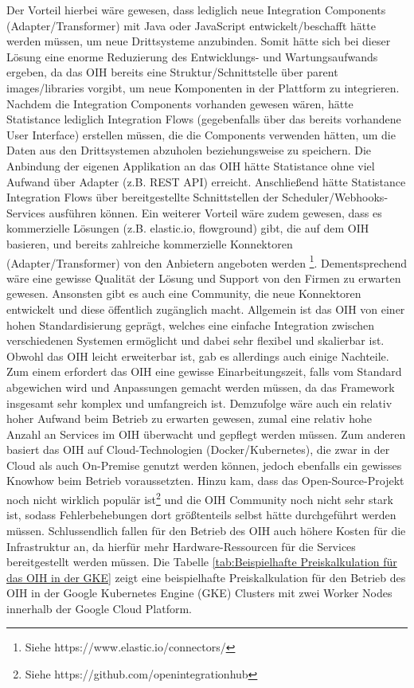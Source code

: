 Der Vorteil hierbei wäre gewesen, dass lediglich neue Integration Components (Adapter/Transformer) mit Java oder JavaScript entwickelt/beschafft hätte werden müssen, um neue Drittsysteme anzubinden. Somit hätte sich bei dieser Lösung eine enorme Reduzierung des Entwicklungs- und Wartungsaufwands ergeben, da das OIH bereits eine Struktur/Schnittstelle über parent images/libraries vorgibt, um neue Komponenten in der Plattform zu integrieren. Nachdem die Integration Components vorhanden gewesen wären, hätte Statistance lediglich Integration Flows (gegebenfalls über das bereits vorhandene User Interface) erstellen müssen, die die Components verwenden hätten, um die Daten aus den Drittsystemen abzuholen beziehungsweise zu speichern. Die Anbindung der eigenen Applikation an das OIH hätte Statistance ohne viel Aufwand über Adapter (z.B. REST API) erreicht. Anschließend hätte Statistance Integration Flows über bereitgestellte Schnittstellen der Scheduler/Webhooks-Services ausführen können. Ein weiterer Vorteil wäre zudem gewesen, dass es kommerzielle Lösungen (z.B. elastic.io, flowground) gibt, die auf dem OIH basieren, und bereits zahlreiche kommerzielle Konnektoren (Adapter/Transformer) von den Anbietern angeboten werden \footnote{Siehe https://www.elastic.io/connectors/}. Dementsprechend wäre eine gewisse Qualität der Lösung und Support von den Firmen zu erwarten gewesen. Ansonsten gibt es auch eine Community, die neue Konnektoren entwickelt und diese öffentlich zugänglich macht. Allgemein ist das OIH von einer hohen Standardisierung geprägt, welches eine einfache Integration zwischen verschiedenen Systemen ermöglicht und dabei sehr flexibel und skalierbar ist. \\
Obwohl das OIH leicht erweiterbar ist, gab es allerdings auch einige Nachteile. Zum einem erfordert das OIH eine gewisse Einarbeitungszeit, falls vom Standard abgewichen wird und Anpassungen gemacht werden müssen, da das Framework insgesamt sehr komplex und umfangreich ist. Demzufolge wäre auch ein relativ hoher Aufwand beim Betrieb zu erwarten gewesen, zumal eine relativ hohe Anzahl an Services im OIH überwacht und gepflegt werden müssen. Zum anderen basiert das OIH auf Cloud-Technologien (Docker/Kubernetes), die zwar in der Cloud als auch On-Premise genutzt werden können, jedoch ebenfalls ein gewisses Knowhow beim Betrieb voraussetzten. Hinzu kam, dass das Open-Source-Projekt noch nicht wirklich populär ist\footnote{Siehe https://github.com/openintegrationhub} und die OIH Community noch nicht sehr stark ist, sodass Fehlerbehebungen dort größtenteils selbst hätte durchgeführt werden müssen. Schlussendlich fallen für den Betrieb des OIH auch höhere Kosten für die Infrastruktur an, da hierfür mehr Hardware-Ressourcen für die Services bereitgestellt werden müssen. Die Tabelle \ref{tab:Beispielhafte Preiskalkulation für das OIH in der GKE} zeigt eine beispielhafte Preiskalkulation für den Betrieb des OIH in der Google Kubernetes Engine (GKE) Clusters mit zwei Worker Nodes innerhalb der Google Cloud Platform.

